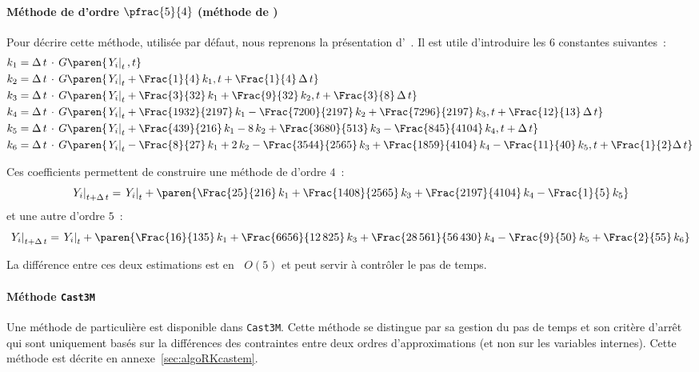 \documentclass[rectoverso,pleiades,pstricks,leqno,anti]{texmf/note_technique_2010}
\newcommand{\castem}{\texttt{Cast3M}}
\newcommand{\bigO}[1]{\ensuremath{\mathop{}\mathopen{}O\mathopen{}\left(#1\right)}}
\newcommand{\debutpas}[1]{\ensuremath{\left.#1\right|_{t}}}
\newcommand{\finpas}[1]{\ensuremath{\left.#1\right|_{t+\Delta\, t}}}
\begin{document}
\paragraph{Méthode de  d'ordre $\pfrac{5}{4}$ (méthode
  de )} Pour décrire cette méthode, utilisée par défaut,
nous reprenons la présentation d'~\cite{fortin01:_analy}.
Il est utile d'introduire les \(6\) constantes suivantes~:
\[
\begin{aligned}
  k_{1} &= \Delta\,t\,\cdot\,G\paren{\debutpas{Y_{i}},t} \\
  k_{2} &=
  \Delta\,t\,\cdot\,G\paren{\debutpas{Y_{i}}+\Frac{1}{4}\,k_{1},t+\Frac{1}{4}\,\Delta\,t}\\
 k_{3} &=
  \Delta\,t\,\cdot\,G\paren{\debutpas{Y_{i}}+\Frac{3}{32}\,k_{1}+\Frac{9}{32}\,k_{2},t+\Frac{3}{8}\,\Delta\,t}
 \\
  k_{4} &=
  \Delta\,t\,\cdot\,G\paren{\debutpas{Y_{i}}+\Frac{1932}{2197}\,k_{1}-\Frac{7200}{2197}\,k_{2}+\Frac{7296}{2197}\,k_{3},t+\Frac{12}{13}\,\Delta\,t}\\
 k_{5} &=
  \Delta\,t\,\cdot\,G\paren{\debutpas{Y_{i}}+\Frac{439}{216}\,k_{1}-8\,k_{2}+\Frac{3680}{513}\,k_{3}-\Frac{845}{4104}\,k_{4},t+\Delta\,t}\\
 k_{6} &=
  \Delta\,t\,\cdot\,G\paren{\debutpas{Y_{i}}-\Frac{8}{27}\,k_{1}+2\,k_{2}-\Frac{3544}{2565}\,k_{3}+\Frac{1859}{4104}\,k_{4}-\Frac{11}{40}\,k_{5},t+\Frac{1}{2}\Delta\,t}\\
\end{aligned}
\]

Ces coefficients permettent de construire une méthode de
 d'ordre \(4\)~:
\[
\finpas{Y_{i}}=\debutpas{Y_{i}}+\paren{\Frac{25}{216}\,k_{1}+\Frac{1408}{2565}\,k_{3}+\Frac{2197}{4104}\,k_{4}-\Frac{1}{5}\,k_{5}}
\]
et une autre d'ordre \(5\)~:
\[
\finpas{Y_{i}}=\debutpas{Y_{i}}+\paren{\Frac{16}{135}\,k_{1}+\Frac{6656}{12\,825}\,k_{3}+\Frac{28\,561}{56\,430}\,k_{4}-\Frac{9}{50}\,k_{5}+\Frac{2}{55}\,k_{6}}
\]

La différence entre ces deux estimations est en \(\bigO 5\) et peut
servir à contrôler le pas de temps.

\paragraph{Méthode \castem{}} Une méthode de 
particulière est disponible dans \castem{}. Cette méthode se distingue
par sa gestion du pas de temps et son critère d'arrêt qui sont
uniquement basés sur la différences des contraintes entre deux ordres
d'approximations (et non sur les variables internes). Cette méthode est
décrite en annexe~\ref{sec:algoRKcastem}.
\end{document}
